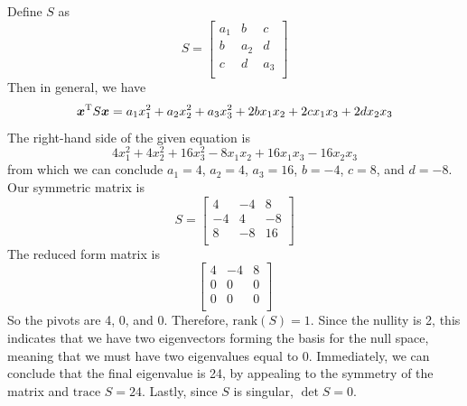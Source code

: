 \documentclass[a4paper]{article}
\begin{document}
Define \(S\) as
\[
	S = 
	\begin{bmatrix}
		a_{1} & b & c \\
		b & a_{2} & d \\
		c & d & a_{3} \\
	\end{bmatrix}
\]
Then in general, we have
\[
	\bm{x}^{\textsc{T}}S \bm{x} = a_{1} x^{2}_{1} + a_{2}x^{2}_{2} + a_{3}x^{2}_{3} + 2bx_{1}x_{2} + 2cx_{1}x_{3} + 2dx_{2}x_{3} 
\]
The right-hand side of the given equation is
\[
	4x^{2}_{1} + 4x^{2}_{2} + 16x^{2}_{3} - 8x_{1}x_{2} + 16x_{1}x_{3} - 16x_{2}x_{3}
\]
from which we can conclude \(a_{1} = 4\), \(a_{2} = 4\), \(a_{3} = 16\), \(b = -4\), \(c = 8\), and \(d = -8\). Our symmetric matrix is
\[
	S = 
	\begin{bmatrix}
		4 & -4 & 8 \\
		-4 & 4 & -8 \\
		8 & -8 & 16 \\
	\end{bmatrix}
\]
The reduced form matrix is
\[
	\begin{bmatrix}
		4 & -4 & 8 \\
		0 & 0 & 0 \\
		0 & 0 & 0 \\
	\end{bmatrix}
\]
So the pivots are 4, 0, and 0. Therefore, \(\text{rank}\!\left( S \right) = 1\). Since the nullity is 2, this indicates that we have two eigenvectors forming the basis for the null space, meaning that we must have two eigenvalues equal to 0. Immediately, we can conclude that the final eigenvalue is 24, by appealing to the symmetry of the matrix and \(\text{trace } S = 24\). Lastly, since \(S\) is singular, \(\det S = 0\). 

\vspace{12pt}

\end{document}
